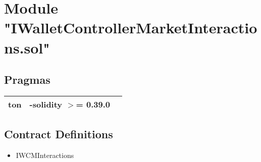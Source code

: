 
\section{Module "IWalletControllerMarketInteractions.sol"}


\subsection{Pragmas}


\noindent\begin{tabular}{|l|l|p{5cm}|}\hline
ton & -solidity $>$= 0.39.0 &\\\hline
\end{tabular}


\subsection{Contract Definitions}

\begin{itemize}
\item IWCMInteractions
\end{itemize}
